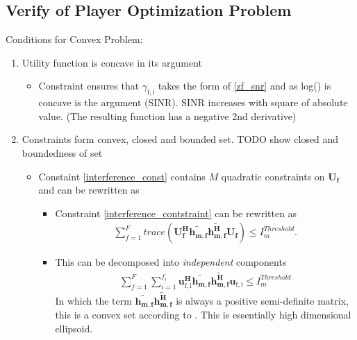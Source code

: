 \documentclass[12pt]{article}
\begin{document}
\subsection{Verify of Player Optimization Problem}

Conditions for Convex Problem:

\begin{enumerate}
\item Utility function is concave in its argument 
\begin{itemize}
\item Constraint  ensures that $\gamma_{\mathrm{f,i}}$ takes the form of \eqref{zf_snr} and  as log() is concave is the argument (SINR). SINR increases with square of absolute value. (The resulting function has a negative 2nd derivative)

\end{itemize}

\item
	Constraints form convex, closed and bounded set. TODO show closed and boundedness of set

\begin{itemize}

\item
	Constaint \eqref{interference_const} contains $M$ quadratic constraints on $\mathbf{U_f}$ and 
	can be rewritten as 
\begin{itemize}
\item 
	Constraint \eqref{interference_contstraint} can be rewritten as 
\begin{gather}
	\sum_{f=1}^F
	trace(\mathbf{U_f^H} \mathbf{\tilde{h_{m,f}}} \mathbf{\tilde{h_{m,f}^H}} \mathbf{U_f} )\leq 
	I^{Threshold}_{m}.
\end{gather}
\item This can be decomposed into \textit{independent} components 
	\begin{gather}
	\sum_{f=1}^F
	\sum_{i=1}^{f_i}
	\mathbf{u_{\mathrm{f,i}}^H} \mathbf{\tilde{h_{m,f}}} \mathbf{\tilde{h_{m,f}^H}} 
	\mathbf{u_{\mathrm{f,i}}} \leq I^{Threshold}_{m}
	\end{gather}
In which the term $ \mathbf{\tilde{h_{m,f}}} \mathbf{\tilde{h_{m,f}^H}}$ is always a positive semi-definite matrix, this is a convex set according to 
\cite[p.8,9]{BoV:04}. This is essentially high dimensional ellipsoid.


\end{itemize}


\end{itemize}
\end{enumerate}
\end{document}
